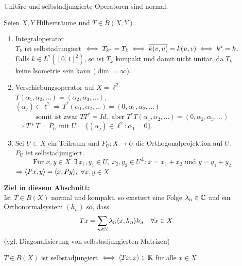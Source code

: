 \begin{bemerkung*}
	Unitäre und selbstadjungierte Operatoren sind normal.	
\end{bemerkung*}


\begin{beispiel}
	Seien $X, Y$ Hilberträume und $T \in B(X, Y)$.
	\begin{enumerate}[label=\alph*\upshape)]
		\item Integraloperator \\
			$T_{k}$	ist selbstadjungiert $\iff T_{k^{*}} = T_{k} \iff \overline{k(v, u)} = k(u, v) \iff k^{*} = k$. \\
			Falls $k \in L^{2}\left([0, 1]^{2}\right)$, so ist $T_{k}$ kompakt und damit nicht unitär, da $T_{k}$ keine Isometrie sein kann ($\dim = \infty$).
		\item Verschiebungsoperator auf $X = \ell^{2}$ \\
			$T(\alpha_{1}, \alpha_{2}, \dotsc ) = (\alpha_{2}, \alpha_{3}, \dotsc )$, $(\alpha_{j}) \in \ell^{2} \Rightarrow T^{*}(\alpha_{1}, \alpha_{2}, \dotsc ) = (0, \alpha_{1}, \alpha_{2}, \dotsc )$ \\
			\[ \text{somit ist zwar } T T^{*} = Id, \text { aber } T^{*} T (\alpha_{1}, \alpha_{2}, \dotsc ) = (0, \alpha_{2}, \alpha_{3}, \dotsc ) \]
			$\Rightarrow T* T = P_{U}$ mit $U = \{ (\alpha_{j}) \in \ell^{2} \colon \alpha_{1} = 0 \}$.
		\item Sei $U \subset X$ ein Teilraum und $P_{U} \colon X \rightarrow U$ die Orthogonalprojektion auf $U$. \\
			$P_{U}$ ist selbstadjungiert.
			\[ \text{Für } x, y \in X ~ ~ \exists ~ x_{1}, y_{1} \in U, ~ x_{2}, y_{2} \in U^{\bot}: x = x_{1} + x_{2} \text{ und } y = y_{1} + y_{2} \]
			$\Rightarrow \langle P x , y \rangle = \langle x , P y \rangle,$ $\forall x,y \in X$.
	\end{enumerate}
\end{beispiel}



\textbf{Ziel in diesem Abschnitt:} \\
	Ist $T \in B(X)$ normal und kompakt, so existiert eine Folge $\lambda_{n} \in \mathbb{C}$ und ein Orthonormalsystem $(h_{n})$ so, dass
	\[ T x = \sum_{n \in \mathbb{N}} \lambda_{n} \langle x , h_{n} \rangle h_{n} \quad \forall x \in X \]	
	(vgl. Diagonalisierung von selbstadjungierten Matrizen)



\begin{satz}
	$T \in B(X)$ ist selbstadjungiert $\iff \langle T x , x \rangle \in \mathbb{R}$ für alle $x \in X$
\end{satz}

